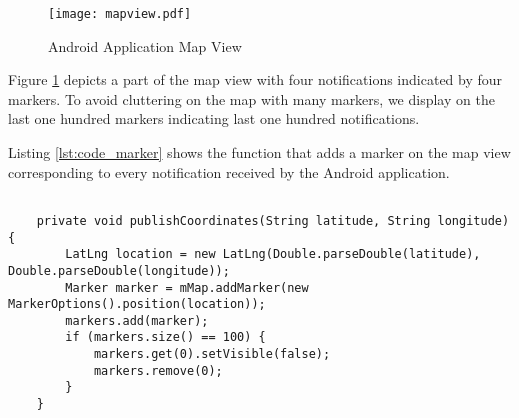 \begin{figure}[h!]
\centering
\texttt{[image: mapview.pdf]}
\caption{Android Application Map View}\label{figures:android_map}
\end{figure}

Figure \ref{figures:android_map} depicts a part of the map view with four notifications indicated by four markers. To avoid cluttering on the map with many markers, we display on the last one hundred markers indicating last one hundred notifications.

Listing \ref{lst:code_marker} shows the function that adds a marker on the map view corresponding to every notification received by the Android application.

\bigskip
\begin{lstlisting}[style=JavaInputStyle,caption=Function to add marker on Map, label={lst:code_marker}]

    private void publishCoordinates(String latitude, String longitude) {
        LatLng location = new LatLng(Double.parseDouble(latitude), Double.parseDouble(longitude));
        Marker marker = mMap.addMarker(new MarkerOptions().position(location));
        markers.add(marker);
        if (markers.size() == 100) {
            markers.get(0).setVisible(false);
            markers.remove(0);
        }
    }

\end{lstlisting}